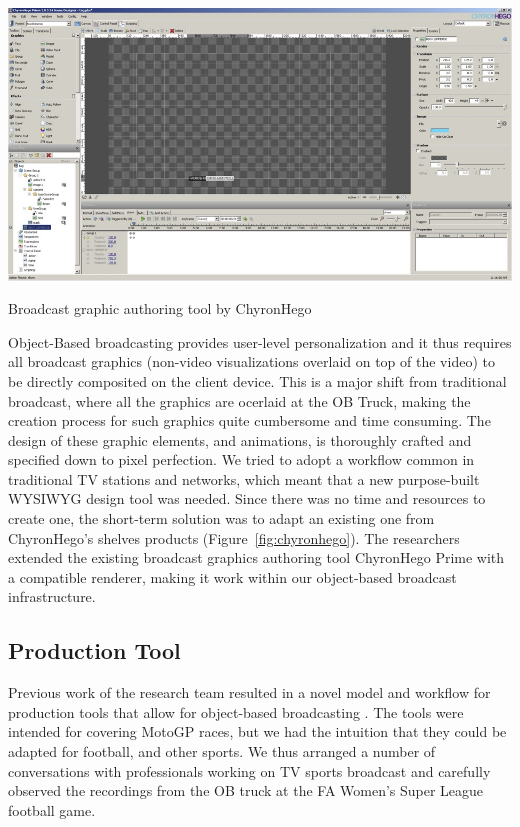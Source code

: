 \documentclass[sigchi-a, authorversion]{acmart}
\begin{document}
\begin{marginfigure}
    \includegraphics[width=\marginparwidth]{Figures/ChyronHegotool.jpg}
    \caption{Broadcast graphic authoring tool by ChyronHego}
    \label{fig:chyronhego}
\end{marginfigure}

Object-Based broadcasting provides user-level personalization and it thus requires all broadcast graphics (non-video visualizations overlaid on top of the video) to be directly composited on the client device. This is a major shift from traditional broadcast, where all the graphics are ocerlaid at the OB Truck, making the creation process for such graphics quite cumbersome and time consuming. The design of these graphic elements, and animations, is thoroughly crafted and specified down to pixel perfection. We tried to adopt a workflow common in traditional TV stations and networks, which meant that a new purpose-built WYSIWYG design tool was needed. Since there was no time and resources to create one, the short-term solution was to adapt an existing one from ChyronHego's shelves products (Figure~\ref{fig:chyronhego}). The researchers extended the existing broadcast graphics authoring tool ChyronHego Prime with a compatible renderer, making it work within our object-based broadcast infrastructure.

\subsection{Production Tool}
Previous work of the research team resulted in a novel model and workflow for production tools that allow for object-based broadcasting \cite{Li:2018_TVX}. The tools were intended for covering MotoGP races, but we had the intuition that they could be adapted for football, and other sports. We thus arranged a number of conversations with professionals working on TV sports broadcast and carefully observed the recordings from the OB truck at the FA Women's Super League football game. 
\end{document}
